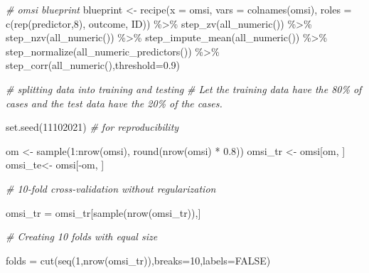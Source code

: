 \documentclass[
  english,
  man]{apa6}
\newenvironment{Shaded}{\begin{snugshade}}{\end{snugshade}}
\newcommand{\AttributeTok}[1]{\textcolor[rgb]{0.77,0.63,0.00}{#1}}
\newcommand{\CommentTok}[1]{\textcolor[rgb]{0.56,0.35,0.01}{\textit{#1}}}
\newcommand{\ConstantTok}[1]{\textcolor[rgb]{0.00,0.00,0.00}{#1}}
\newcommand{\DecValTok}[1]{\textcolor[rgb]{0.00,0.00,0.81}{#1}}
\newcommand{\FloatTok}[1]{\textcolor[rgb]{0.00,0.00,0.81}{#1}}
\newcommand{\FunctionTok}[1]{\textcolor[rgb]{0.00,0.00,0.00}{#1}}
\newcommand{\NormalTok}[1]{#1}
\newcommand{\OtherTok}[1]{\textcolor[rgb]{0.56,0.35,0.01}{#1}}
\newcommand{\SpecialCharTok}[1]{\textcolor[rgb]{0.00,0.00,0.00}{#1}}
\newcommand{\StringTok}[1]{\textcolor[rgb]{0.31,0.60,0.02}{#1}}
\begin{document}
\begin{Shaded}
\begin{Highlighting}[]
 
\CommentTok{\# omsi blueprint}
\NormalTok{ blueprint }\OtherTok{\textless{}{-}} \FunctionTok{recipe}\NormalTok{(}\AttributeTok{x  =}\NormalTok{ omsi,}
                    \AttributeTok{vars  =} \FunctionTok{colnames}\NormalTok{(omsi),}
                    \AttributeTok{roles =} \FunctionTok{c}\NormalTok{(}\FunctionTok{rep}\NormalTok{(}\StringTok{\textquotesingle{}predictor\textquotesingle{}}\NormalTok{,}\DecValTok{8}\NormalTok{), }\StringTok{\textquotesingle{}outcome\textquotesingle{}}\NormalTok{, }\StringTok{\textquotesingle{}ID\textquotesingle{}}\NormalTok{)) }\SpecialCharTok{\%\textgreater{}\%}
   \FunctionTok{step\_zv}\NormalTok{(}\FunctionTok{all\_numeric}\NormalTok{()) }\SpecialCharTok{\%\textgreater{}\%}
    \FunctionTok{step\_nzv}\NormalTok{(}\FunctionTok{all\_numeric}\NormalTok{()) }\SpecialCharTok{\%\textgreater{}\%}
    \FunctionTok{step\_impute\_mean}\NormalTok{(}\FunctionTok{all\_numeric}\NormalTok{()) }\SpecialCharTok{\%\textgreater{}\%}
    \FunctionTok{step\_normalize}\NormalTok{(}\FunctionTok{all\_numeric\_predictors}\NormalTok{()) }\SpecialCharTok{\%\textgreater{}\%}
    \FunctionTok{step\_corr}\NormalTok{(}\FunctionTok{all\_numeric}\NormalTok{(),}\AttributeTok{threshold=}\FloatTok{0.9}\NormalTok{)}


\CommentTok{\# splitting data into training and testing}
\CommentTok{\# Let the training data have the 80\% of cases and the test data have the 20\% of the cases.}

\FunctionTok{set.seed}\NormalTok{(}\DecValTok{11102021}\NormalTok{)  }\CommentTok{\# for reproducibility}
  
\NormalTok{om     }\OtherTok{\textless{}{-}} \FunctionTok{sample}\NormalTok{(}\DecValTok{1}\SpecialCharTok{:}\FunctionTok{nrow}\NormalTok{(omsi), }\FunctionTok{round}\NormalTok{(}\FunctionTok{nrow}\NormalTok{(omsi) }\SpecialCharTok{*} \FloatTok{0.8}\NormalTok{))}
\NormalTok{omsi\_tr  }\OtherTok{\textless{}{-}}\NormalTok{ omsi[om, ]}
\NormalTok{omsi\_te}\OtherTok{\textless{}{-}}\NormalTok{ omsi[}\SpecialCharTok{{-}}\NormalTok{om, ]}

\CommentTok{\# 10{-}fold cross{-}validation without regularization}

\NormalTok{omsi\_tr }\OtherTok{=}\NormalTok{ omsi\_tr[}\FunctionTok{sample}\NormalTok{(}\FunctionTok{nrow}\NormalTok{(omsi\_tr)),]}

  \CommentTok{\# Creating 10 folds with equal size}

\NormalTok{folds }\OtherTok{=} \FunctionTok{cut}\NormalTok{(}\FunctionTok{seq}\NormalTok{(}\DecValTok{1}\NormalTok{,}\FunctionTok{nrow}\NormalTok{(omsi\_tr)),}\AttributeTok{breaks=}\DecValTok{10}\NormalTok{,}\AttributeTok{labels=}\ConstantTok{FALSE}\NormalTok{)}
  

\end{Highlighting}
\end{Shaded}
\end{document}
